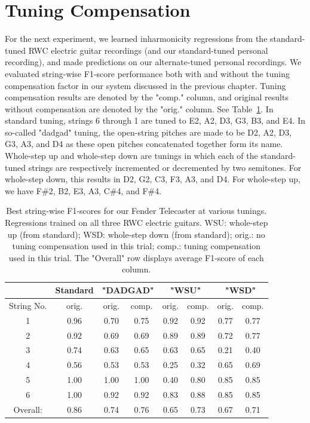 \documentclass[12pt]{cmuthesis}
\begin{document}
\section{Tuning Compensation}
For the next experiment, we learned inharmonicity regressions from the standard-tuned RWC electric guitar recordings (and our standard-tuned personal recording), and made predictions on our alternate-tuned personal recordings. We evaluated string-wise F1-score performance both with and without the tuning compensation factor in our system discussed in the previous chapter. Tuning compensation results are denoted by the "comp." column, and original results without compensation are denoted by the "orig." column. See Table~\ref{tab:resultsTune}. In standard tuning, strings 6 through 1 are tuned to E2, A2, D3, G3, B3, and E4. In so-called "dadgad" tuning, the open-string pitches are made to be D2, A2, D3, G3, A3, and D4 as these open pitches concatenated together form its name. Whole-step up and whole-step down are tunings in which each of the standard-tuned strings are respectively incremented or decremented by two semitones. For whole-step down, this results in D2, G2, C3, F3, A3, and D4. For whole-step up, we have F\#2, B2, E3, A3, C\#4, and F\#4.

\begin{table}
\begin{center}
\begin{tabular}{||c||c||c|c||c|c||c|c||}
\hline
& Standard & \multicolumn{2}{|c|}{"DADGAD"} & \multicolumn{2}{|c|}{"WSU"} & \multicolumn{2}{|c|}{"WSD"} \\
\hline
String No. & orig. & orig. & comp. & orig. & comp. & orig. & comp. \\
\hline
1 & 0.96 & 0.70 & 0.75 & 0.92 & 0.92 & 0.77 & 0.77 \\
\hline
2 & 0.92 & 0.69 & 0.69 & 0.89 & 0.89 & 0.72 & 0.77\\
\hline
3 & 0.74 & 0.63 & 0.65 & 0.63 & 0.65 & 0.21 & 0.40\\
\hline
4 & 0.56 & 0.53 & 0.53 & 0.25 & 0.32 & 0.65 & 0.69 \\
\hline
5 & 1.00 & 1.00 & 1.00 & 0.40 & 0.80 & 0.85 & 0.85 \\
\hline
6 & 1.00 & 0.92 & 0.92 & 0.83 & 0.88 & 0.85 & 0.85\\ 
\hline
\hline
Overall: & 0.86 & 0.74 & 0.76 & 0.65 & 0.73 & 0.67 & 0.71\\
\hline
\end{tabular}
\caption{Best string-wise F1-scores for our Fender Telecaster at various tunings. Regressions trained on all three RWC electric guitars. WSU: whole-step up (from standard); WSD: whole-step down (from standard); orig.: no tuning compensation used in this trial; comp.: tuning compensation used in this trial. The "Overall" row displays average F1-score of each column.} 
\label{tab:resultsTune}
\end{center}
\end{table}
\end{document}
